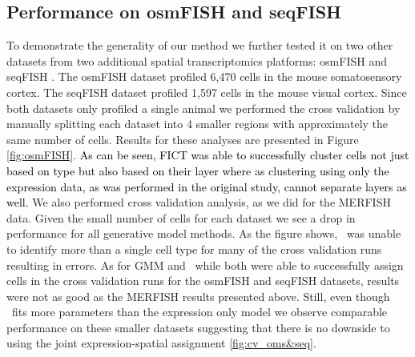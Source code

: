 \subsection{Performance on osmFISH and seqFISH}

To demonstrate the generality of our method we further tested it on two other datasets from two additional spatial transcriptomics platforms: osmFISH \cite{codeluppi2018spatial} and seqFISH \cite{zhu2018identification}. The osmFISH dataset profiled 6,470 cells in the mouse somatosensory cortex. The seqFISH dataset profiled 1,597 cells in the mouse visual cortex. Since both datasets only profiled a single animal we performed the cross validation by manually splitting each dataset into 4 smaller regions with approximately the same number of cells. Results for these analyses are presented in Figure \ref{fig:osmFISH}. \textcolor{black}{As can be seen, FICT was able to successfully cluster cells not just based on type but also based on their layer where as clustering using only the expression data, as was performed in the original study, cannot separate layers as well.} We also performed cross validation analysis, as we did for the MERFISH data. Given the small number of cells for each dataset we see a drop in performance for all generative model methods. As the figure shows, \smfish\ was unable to identify more than a single cell type for many of the cross validation runs resulting in errors. As for GMM and \fict\, while both were able to successfully assign cells in the cross validation runs for the osmFISH and seqFISH datasets, results were not as good as the MERFISH results presented above. Still, even though \fict\ fits more parameters than the expression only model we observe comparable performance on these smaller datasets suggesting that there is no downside to using the joint expression-spatial assignment \ref{fig:cv_oms&seq}.
